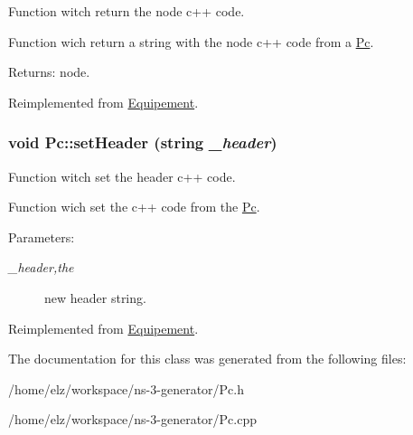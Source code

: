 Function witch return the node c++ code. 

Function wich return a string with the node c++ code from a \hyperlink{class_pc}{Pc}.

\begin{Desc}
\item[Returns:]node. \end{Desc}


Reimplemented from \hyperlink{class_equipement_e51f720e7db340b33d7392eb78c9cea2}{Equipement}.\hypertarget{class_pc_45386d5f2837f3d2087fe62ca1692883}{
\subsubsection[{setHeader}]{\setlength{\rightskip}{0pt plus 5cm}void Pc::setHeader (string {\em \_\-header})}}
\label{class_pc_45386d5f2837f3d2087fe62ca1692883}


Function witch set the header c++ code. 

Function wich set the c++ code from the \hyperlink{class_pc}{Pc}.

\begin{Desc}
\item[Parameters:]
\begin{description}
\item[{\em \_\-header,the}]new header string. \end{description}
\end{Desc}


Reimplemented from \hyperlink{class_equipement_95b372e1d9f733f4c8fde9b3a1cf8321}{Equipement}.

The documentation for this class was generated from the following files:\begin{CompactItemize}
\item 
/home/elz/workspace/ns-3-generator/Pc.h\item 
/home/elz/workspace/ns-3-generator/Pc.cpp\end{CompactItemize}
